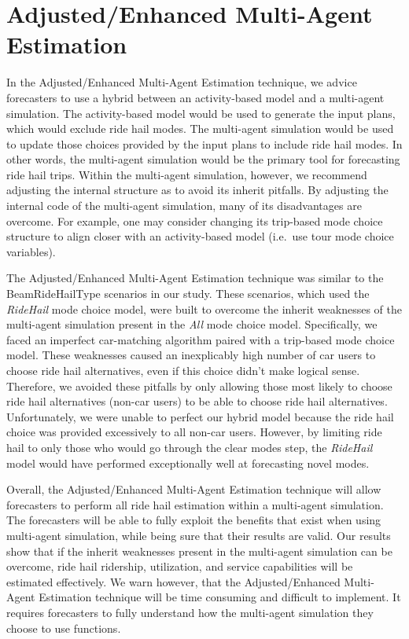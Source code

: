 \documentclass[12pt, oneside, openright]{byuthesis}
\begin{document}
\hypertarget{adjustedenhanced-multi-agent-estimation}{%
\section{Adjusted/Enhanced Multi-Agent Estimation}\label{adjustedenhanced-multi-agent-estimation}}

In the Adjusted/Enhanced Multi-Agent Estimation technique, we advice forecasters to use a hybrid between an activity-based model and a multi-agent simulation. The activity-based model would be used to generate the input plans, which would exclude ride hail modes. The multi-agent simulation would be used to update those choices provided by the input plans to include ride hail modes. In other words, the multi-agent simulation would be the primary tool for forecasting ride hail trips. Within the multi-agent simulation, however, we recommend adjusting the internal structure as to avoid its inherit pitfalls. By adjusting the internal code of the multi-agent simulation, many of its disadvantages are overcome. For example, one may consider changing its trip-based mode choice structure to align closer with an activity-based model (i.e.~use tour mode choice variables).

The Adjusted/Enhanced Multi-Agent Estimation technique was similar to the BeamRideHailType scenarios in our study. These scenarios, which used the \emph{RideHail} mode choice model, were built to overcome the inherit weaknesses of the multi-agent simulation present in the \emph{All} mode choice model. Specifically, we faced an imperfect car-matching algorithm paired with a trip-based mode choice model. These weaknesses caused an inexplicably high number of car users to choose ride hail alternatives, even if this choice didn't make logical sense. Therefore, we avoided these pitfalls by only allowing those most likely to choose ride hail alternatives (non-car users) to be able to choose ride hail alternatives. Unfortunately, we were unable to perfect our hybrid model because the ride hail choice was provided excessively to all non-car users. However, by limiting ride hail to only those who would go through the clear modes step, the \emph{RideHail} model would have performed exceptionally well at forecasting novel modes.

Overall, the Adjusted/Enhanced Multi-Agent Estimation technique will allow forecasters to perform all ride hail estimation within a multi-agent simulation. The forecasters will be able to fully exploit the benefits that exist when using multi-agent simulation, while being sure that their results are valid. Our results show that if the inherit weaknesses present in the multi-agent simulation can be overcome, ride hail ridership, utilization, and service capabilities will be estimated effectively. We warn however, that the Adjusted/Enhanced Multi-Agent Estimation technique will be time consuming and difficult to implement. It requires forecasters to fully understand how the multi-agent simulation they choose to use functions.
\end{document}
